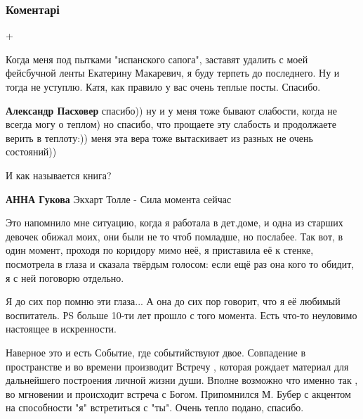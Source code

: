  
 
 
 
 
\subsubsection{Коментарі}

\begin{itemize} %
+


Когда меня под пытками "испанского сапога", заставят удалить с моей фейсбучной
ленты Екатерину Макаревич, я буду терпеть до последнего. Ну и тогда не
уступлю. Катя, как правило у вас очень теплые посты. Спасибо.

\begin{itemize} %
\textbf{Александр Пасховер} спасибо)) ну и у меня тоже бывают слабости, когда не всегда могу о теплом) но спасибо, что прощаете эту слабость и продолжаете верить в теплоту:)) меня эта вера тоже вытаскивает из разных не очень состояний))
\end{itemize} %

И как называется книга?

\begin{itemize} %
\textbf{АННА Гукова} Экхарт Толле - Сила момента сейчас
\end{itemize} %


Это напомнило мне ситуацию, когда я работала в дет.доме, и одна из старших
девочек обижал моих, они были не то чтоб помладше, но послабее. Так вот, в один
момент, проходя по коридору мимо неё, я приставила её к стенке, посмотрела в
глаза и сказала твёрдым голосом: если ещё раз она кого то обидит, я с ней
поговорю отдельно.

Я до сих пор помню эти глаза...
А она до сих пор говорит, что я её любимый воспитатель.
РS больше 10-ти лет прошло с того момента.
Есть что-то неуловимо настоящее в искренности.


Наверное это и есть Событие, где событийствуют двое. Совпадение в пространстве
и во времени производит Встречу , которая рождает материал для дальнейшего
построения личной жизни души. Вполне возможно что именно так , во мгновении и
происходит встреча с Богом. Припомнился М. Бубер с акцентом на способности "я"
встретиться с "ты". Очень тепло подано, спасибо.


\end{itemize}
